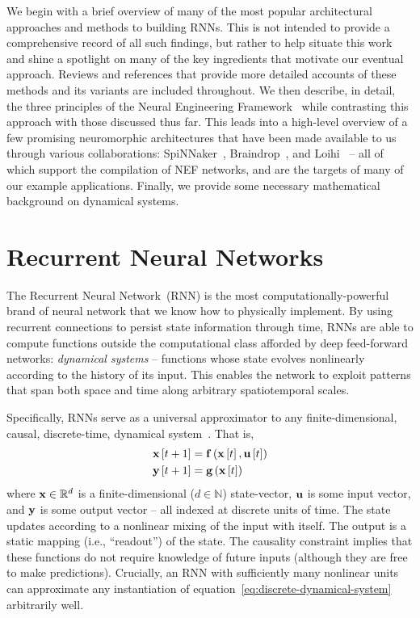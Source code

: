 We begin with a brief overview of many of the most popular architectural approaches and methods to building RNNs.
This is not intended to provide a comprehensive record of all such findings, but rather to help situate this work and shine a spotlight on many of the key ingredients that motivate our eventual approach.
Reviews and references that provide more detailed accounts of these methods and its variants are included throughout.
We then describe, in detail, the three principles of the Neural Engineering Framework~\citep[NEF;][]{eliasmith2003a} while contrasting this approach with those discussed thus far.
This leads into a high-level overview of a few promising neuromorphic architectures that have been made available to us through various collaborations: SpiNNaker~\citep{furber2014spinnaker}, Braindrop~\citep{braindrop2019}, and Loihi~\citep{davies2018loihi} -- all of which support the compilation of NEF networks, and are the targets of many of our example applications.
Finally, we provide some necessary mathematical background on dynamical systems.

\section{Recurrent Neural Networks}

The Recurrent Neural Network~(RNN) is the most computationally-powerful brand of neural network that we know how to physically implement.
By using recurrent connections to persist state information through time, RNNs are able to compute functions outside the computational class afforded by deep feed-forward networks: \emph{dynamical systems} -- functions whose state evolves nonlinearly according to the history of its input.
This enables the network to exploit patterns that span both space and time along arbitrary spatiotemporal scales.

Specifically, RNNs serve as a universal approximator to any finite-dimensional, causal, discrete-time, dynamical system~\citep{schafer2006recurrent}.
That is,
\begin{equation}
\begin{aligned} \label{eq:discrete-dynamical-system}
\mathbf{x}\left[ t + 1 \right] &= \mathbf{f}\left(\mathbf{x}\left[ t \right], \mathbf{u}\left[ t \right] \right) \\
\mathbf{y}\left[ t + 1 \right] &= \mathbf{g}\left(\mathbf{x}\left[ t \right] \right)
\end{aligned}
\end{equation}
where $\mathbf{x} \in \mathbb{R}^d$ is a finite-dimensional ($d \in \mathbb{N}$) state-vector, $\mathbf{u}$ is some input vector, and $\mathbf{y}$ is some output vector -- all indexed at discrete units of time.
The state updates according to a nonlinear mixing of the input with itself.
The output is a static mapping (i.e., ``readout'') of the state.
The causality constraint implies that these functions do not require knowledge of future inputs (although they are free to make predictions).
Crucially, an RNN with sufficiently many nonlinear units can approximate any instantiation of equation~\ref{eq:discrete-dynamical-system} arbitrarily well.

